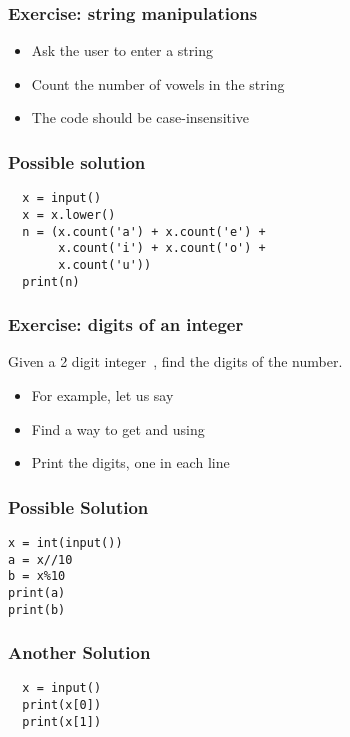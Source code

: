 \documentclass[14pt,compress]{beamer}
\begin{document}
\begin{frame}[plain]
  \frametitle{Exercise: string manipulations}
  \begin{itemize}
  \item Ask the user to enter a string
  \item Count the number of vowels in the string
  \item The code should be case-insensitive
  \end{itemize}
\end{frame}

\begin{frame}
\frametitle{Possible solution}
\begin{lstlisting}
  x = input()
  x = x.lower()
  n = (x.count('a') + x.count('e') +
       x.count('i') + x.count('o') +
       x.count('u'))
  print(n)
\end{lstlisting}
\end{frame}

\begin{frame}[plain]
  \frametitle{Exercise: digits of an integer}
  Given a 2 digit integer\ , find the digits of the number.
  \vspace*{1em}

  \begin{itemize}
  \item For example, let us say 
  \item Find a way to get  and  using 
  \item Print the digits, one in each line
  \end{itemize}
\end{frame}

\begin{frame}
  \frametitle{Possible Solution}
  \begin{lstlisting}
x = int(input())
a = x//10
b = x%10
print(a)
print(b)
\end{lstlisting}
\end{frame}

\begin{frame}
  \frametitle{Another Solution}
\begin{lstlisting}
  x = input()
  print(x[0])
  print(x[1])
\end{lstlisting}
\end{frame}
\end{document}
